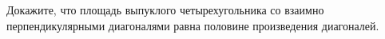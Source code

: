 \begin{ex}
	\begin{condition}
		Докажите, что площадь выпуклого четырехугольника со взаимно перпендикулярными диагоналями равна половине произведения диагоналей.
	\end{condition}
\end{ex}